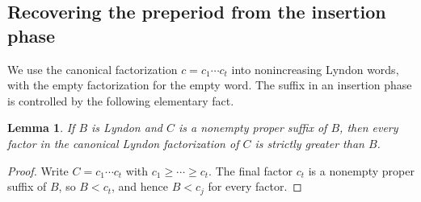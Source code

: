 \documentclass[11pt]{amsart}
\numberwithin{equation}{section}
\newtheorem{lemma}[theorem]{Lemma}
\theoremstyle{definition}
\begin{document}
\subsection{Recovering the preperiod from the insertion phase}
We use the canonical factorization $c=c_1\cdots c_t$ into nonincreasing Lyndon words, with the empty factorization for the empty word. The suffix in an insertion phase is controlled by the following elementary fact.

\begin{lemma}\label{lem:suffix-factors}
If $B$ is Lyndon and $C$ is a nonempty proper suffix of $B$, then every factor in the canonical Lyndon factorization of $C$ is strictly greater than $B$.
\end{lemma}
\begin{proof}
Write $C=c_1\cdots c_t$ with $c_1\geq\cdots\geq c_t$. The final factor $c_t$ is a nonempty proper suffix of $B$, so $B<c_t$, and hence $B<c_j$ for every factor.
\end{proof}
\end{document}
